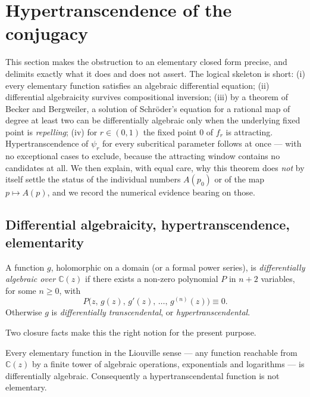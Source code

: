 \section{Hypertranscendence of the conjugacy}
\label{a:sec:ht}

This section makes the obstruction to an elementary closed form precise, and
delimits exactly what it does and does not assert. The logical skeleton is short:
(i) every elementary function satisfies an algebraic differential equation;
(ii) differential algebraicity survives compositional inversion;
(iii) by a theorem of Becker and Bergweiler, a solution of Schr\"oder's equation
for a rational map of degree at least two can be differentially algebraic only
when the underlying fixed point is \emph{repelling};
(iv) for $r\in(0,1)$ the fixed point $0$ of $f_r$ is attracting.
Hypertranscendence of $\psi_r$ for every subcritical parameter follows at once ---
with no exceptional cases to exclude, because the attracting window contains no
candidates at all. We then explain, with equal care, why this theorem does
\emph{not} by itself settle the status of the individual numbers $A(p_0)$ or of
the map $p\mapsto A(p)$, and we record the numerical evidence bearing on those.

\subsection{Differential algebraicity, hypertranscendence, elementarity}
\label{a:sec:definitions}

\begin{definition}
\label{a:def:da}
A function $g$, holomorphic on a domain (or a formal power series), is
\emph{differentially algebraic over $\mathbb{C}(z)$} if there exists a non-zero
polynomial $P$ in $n+2$ variables, for some $n\ge0$, with
\begin{equation*}
P\bigl(z,\,g(z),\,g'(z),\,\dots,\,g^{(n)}(z)\bigr)\equiv 0 .
\end{equation*}
Otherwise $g$ is \emph{differentially transcendental}, or
\emph{hypertranscendental}.
\end{definition}

Two closure facts make this the right notion for the present purpose.

\begin{lemma}
\label{a:lem:elemDA}
Every elementary function in the Liouville sense --- any function reachable from
$\mathbb{C}(z)$ by a finite tower of algebraic operations, exponentials and
logarithms --- is differentially algebraic. Consequently a hypertranscendental
function is not elementary.
\end{lemma}

